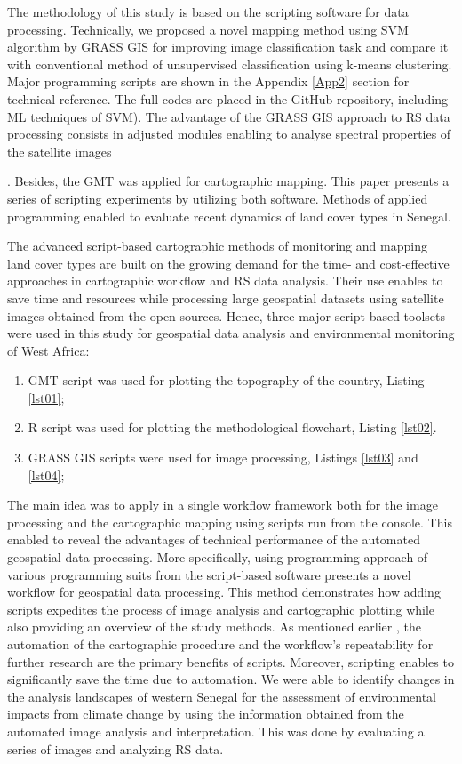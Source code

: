 \documentclass[earth,article,submit,pdftex,moreauthors]{Definitions/mdpi}
\begin{document}
The methodology of this study {is based on the}{ }scripting software for data processing{. Technically, we proposed a novel mapping method using SVM algorithm by GRASS GIS for improving image classification task and compare it with conventional method of unsupervised classification using k-means clustering. Major }programming scripts {are} shown in the Appendix \ref{App2} section{ }for technical reference{. }{The} full codes are placed in the GitHub repository, including {ML} techniques of {SVM)}. {The} advantage of the GRASS GIS approach {to RS data processing consists in}{ }adjusted modules {enabling }to analyse{ }spectral properties of the {satellite }images{. Besides, the {GMT} {was applied for }cartographic{ }mapping{. This paper presents a series of scripting experiments by utilizing both software. Methods of{ }applied programming enabled to evaluate {recent} dynamics of} land cover {types} in Senegal{.} 

The advanced script-based cartographic methods of monitoring and mapping land cover types are built on the growing demand for the time- and cost-effective approaches in cartographic workflow and {RS} data analysis{. Their use enables} to save time and resources while processing {large }geospatial datasets{ using }satellite images {obtained from the open sources}. Hence, three major script-based toolsets were used in this study for geospatial data analysis and environmental monitoring of West Africa:

 \begin{enumerate}
        \item GMT script was used for plotting the topography of the country, Listing \ref{lst01};  
        \item R script was used for plotting the methodological flowchart, Listing \ref{lst02}. 
         \item GRASS GIS {scripts were} used for image processing, {Listings} \ref{lst03} and \ref{lst04}; 
  \end{enumerate}       

The main idea was to apply in a single workflow framework both for the image processing and the cartographic mapping using scripts run from the console. This enabled to reveal the {advantages of }technical performance of {the }automated geospatial data processing{. More specifically, }using programming approach of{ }various programming suits from the script-based software {presents a novel workflow for geospatial data processing}. {This method demonstrates how adding} scripts {expedites} the process of {image analysis} and cartographic plotting {while also providing} an {overview} of the {study methods}. As mentioned earlier \cite{Lemenkova202215}, {the automation of the cartographic procedure} and the workflow's repeatability for further research are the {primary benefits of scripts. Moreover, scripting} enables to significantly save the time due to automation. We were able to {identify} changes in the analysis landscapes of western Senegal for the {assessment} of environmental {impacts} from climate change {by} using the information {obtained} from {the }automated image analysis and interpretation. {This was done by {evaluating} a} series of images and analyzing {RS} data{.} 

}
\end{document}
